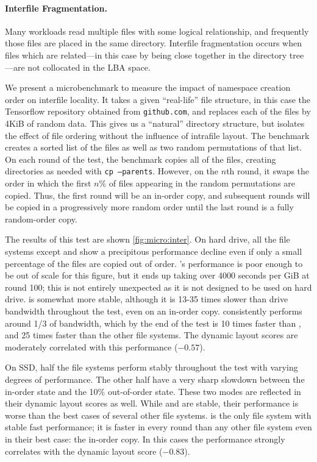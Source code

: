 

\paragraph{Interfile Fragmentation.}\label{sec:interfile} Many workloads read
multiple files with some logical relationship, and frequently those files are
placed in the same directory. Interfile fragmentation occurs when files which
are related---in this case by being close together in the directory tree---are not
collocated in the LBA space.

We present a microbenchmark to measure the impact of namespace creation order
on interfile locality. It takes a given ``real-life'' file structure, in this
case the Tensorflow repository obtained from \texttt{github.com}, and replaces
each of the files by 4KiB of random data. This gives us a ``natural'' directory
structure, but isolates the effect of file ordering without the influence of
intrafile layout. The benchmark creates a sorted list of the files as well as
two random permutations of that list. On each round of the test, the benchmark
copies all of the files, creating directories as needed with {\tt cp
--parents}.  However, on the $n$th round, it swaps the order in which the first
$n\%$ of files appearing in the random permutations are copied. Thus, the first
round will be an in-order copy, and subsequent rounds will be copied in a
progressively more random order until the last round is a fully random-order
copy.

The results of this test are shown \cref{fig:micro:inter}.  On hard
drive, all the file systems except \betrfs and \xfs show a precipitous
performance decline even if only a small percentage of the files are copied out
of order. \ftwofs's performance is poor enough to be out of scale for this
figure, but it ends up taking over 4000 seconds per GiB at round 100; this is
not entirely unexpected as it is not designed to be used on hard drive. \xfs is
somewhat more stable, although it is 13-35 times slower than drive bandwidth
throughout the test, even on an in-order copy.  \betrfs consistently performs
around 1/3 of bandwidth, which by the end of the test is 10 times faster than
\xfs, and 25 times faster than the other file systems. The dynamic layout
scores are moderately correlated with this performance ($-0.57$).

On SSD, half the file systems perform stably throughout the test with varying
degrees of performance. The other half have a very sharp slowdown between the
in-order state and the 10\% out-of-order state. These two modes are reflected
in their dynamic layout scores as well. While \ext and \zfs are stable, their
performance is worse than the best cases of several other file systems.
\betrfs is the only file system with stable fast performance; it is faster in
every round than any other file system even in their best case: the in-order
copy. In this cases the performance strongly correlates with the dynamic layout
score ($-0.83$).
